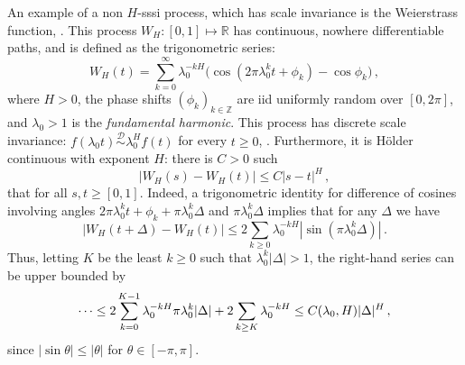 \documentclass[a4paper]{article}
\newcommand{\Real}{\mathbb{R}}
\newcommand{\Dcal}{\mathcal{D}}
\begin{document}
An example of a non $H$-sssi process, which has scale invariance is the Weierstrass
function, \cite{decrouez2013}. This process $W_H:[0,1] \mapsto \Real$ has continuous,
nowhere differentiable paths, and is defined as the trigonometric series:
\begin{equation} \label{eq:def_weir}
    W_H(t) = \sum_{k=0}^\infty \lambda_0^{-k H} \bigl(
            \cos(2\pi \lambda_0^k t + \phi_k) - \cos \phi_k
        \bigr) \,,
\end{equation}
where $H>0$, the phase shifts $(\phi_k)_{k\in\mathbb{Z}}$ are iid uniformly random
over $[0, 2\pi]$, and $\lambda_0 > 1$ is the \emph{fundamental harmonic}. This process
has discrete scale invariance: $f(\lambda_0 t) \overset{\Dcal}{\sim} \lambda_0^H f(t)$
for every $t\geq 0$, \cite{decrouez2015}. Furthermore, it is H\"older continuous
with exponent $H$: there is $C > 0$ such
\begin{equation} \label{eq:def_holder}
    \bigl| W_H(s) - W_H(t) \bigr| \leq C |s - t|^H \,,
\end{equation}
that for all $s,t\geq [0,1]$. Indeed, a trigonometric identity for difference of
cosines involving angles $2\pi \lambda_0^k t + \phi_k + \pi \lambda_0^k \Delta$
and $\pi \lambda_0^k \Delta$ implies that for any $\Delta$ we have
\begin{equation*}
    \bigl| W_H(t+\Delta) - W_H(t) \bigr|
        \leq 2 \sum_{k \geq 0} \lambda_0^{-k H} |\sin(\pi \lambda_0^k \Delta)| \,.
\end{equation*}
Thus, letting $K$ be the least $k\geq 0$ such that $\lambda_0^k |\Delta| > 1$, the
right-hand series can be upper bounded by
\begin{equation} \label{eq:wei_holder}
    \cdots 
        \leq 2 \sum_{k=0}^{K-1} \lambda_0^{-k H} \pi \lambda_0^k |\Delta|
            + 2 \sum_{k\geq K} \lambda_0^{-k H} \\
        \leq C(\lambda_0, H) |\Delta|^H\,,
\end{equation}
since $|\sin \theta|\leq |\theta|$ for $\theta\in[-\pi,\pi]$.

\end{document}
